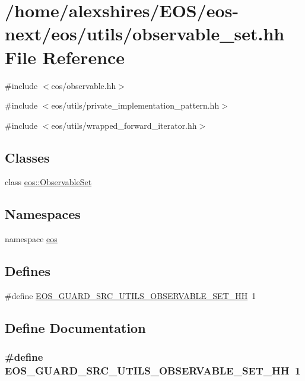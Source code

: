 \hypertarget{observable__set_8hh}{
\section{/home/alexshires/EOS/eos-\/next/eos/utils/observable\_\-set.hh File Reference}
\label{observable__set_8hh}
}
{\ttfamily \#include $<$eos/observable.hh$>$}\par
{\ttfamily \#include $<$eos/utils/private\_\-implementation\_\-pattern.hh$>$}\par
{\ttfamily \#include $<$eos/utils/wrapped\_\-forward\_\-iterator.hh$>$}\par
\subsection*{Classes}
\begin{DoxyCompactItemize}
\item 
class \hyperlink{classeos_1_1ObservableSet}{eos::ObservableSet}
\end{DoxyCompactItemize}
\subsection*{Namespaces}
\begin{DoxyCompactItemize}
\item 
namespace \hyperlink{namespaceeos}{eos}
\end{DoxyCompactItemize}
\subsection*{Defines}
\begin{DoxyCompactItemize}
\item 
\#define \hyperlink{observable__set_8hh_a382e94167f32774fcacf8952a2d8ec4e}{EOS\_\-GUARD\_\-SRC\_\-UTILS\_\-OBSERVABLE\_\-SET\_\-HH}~1
\end{DoxyCompactItemize}


\subsection{Define Documentation}
\hypertarget{observable__set_8hh_a382e94167f32774fcacf8952a2d8ec4e}{
\subsubsection[{EOS\_\-GUARD\_\-SRC\_\-UTILS\_\-OBSERVABLE\_\-SET\_\-HH}]{\setlength{\rightskip}{0pt plus 5cm}\#define EOS\_\-GUARD\_\-SRC\_\-UTILS\_\-OBSERVABLE\_\-SET\_\-HH~1}}
\label{observable__set_8hh_a382e94167f32774fcacf8952a2d8ec4e}
